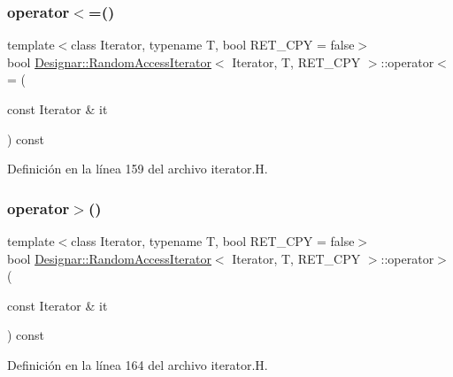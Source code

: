 \subsubsection{\texorpdfstring{operator$<$=()}{operator<=()}}
{\footnotesize\ttfamily template$<$class Iterator, typename T, bool R\+E\+T\+\_\+\+C\+PY = false$>$ \\
bool \hyperlink{class_designar_1_1_random_access_iterator}{Designar\+::\+Random\+Access\+Iterator}$<$ Iterator, T, R\+E\+T\+\_\+\+C\+PY $>$\+::operator$<$= (\begin{DoxyParamCaption}\item[{const Iterator \&}]{it }\end{DoxyParamCaption}) const\hspace{0.3cm}{\ttfamily [inline]}}



Definición en la línea 159 del archivo iterator.\+H.

\mbox{\label{class_designar_1_1_random_access_iterator_a4d72737c88579cc302bc91d3520150fa}} 
\subsubsection{\texorpdfstring{operator$>$()}{operator>()}}
{\footnotesize\ttfamily template$<$class Iterator, typename T, bool R\+E\+T\+\_\+\+C\+PY = false$>$ \\
bool \hyperlink{class_designar_1_1_random_access_iterator}{Designar\+::\+Random\+Access\+Iterator}$<$ Iterator, T, R\+E\+T\+\_\+\+C\+PY $>$\+::operator$>$ (\begin{DoxyParamCaption}\item[{const Iterator \&}]{it }\end{DoxyParamCaption}) const\hspace{0.3cm}{\ttfamily [inline]}}



Definición en la línea 164 del archivo iterator.\+H.

\mbox{\label{class_designar_1_1_random_access_iterator_a38642462d4d39e78533715d41e949a6a}} 
